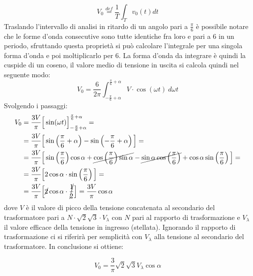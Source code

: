 \documentclass[a4paper,11pt]{article}
\begin{document}
\begin{equation}
 V_0 \stackrel{def}{=} \frac{1}{T}\int_T v_0(t) dt
 \label{eq:def_media_integrale}
\end{equation}
Traslando l'intervallo di analisi in ritardo di un angolo pari a \(\frac{\pi}{6}\) 
è possibile notare che le forme d'onda consecutive sono tutte identiche fra loro e pari %
a 6 in un periodo, sfruttando questa proprietà si può calcolare l'integrale per una singola forma d'onda e poi moltiplicarlo per 6.
La forma d'onda da integrare è quindi la cuspide di un coseno, il valore medio di 
tensione in uscita si calcola quindi nel seguente modo:
\begin{equation}
 V_0 = \frac{6}{2\pi} \int_{-\frac{\pi}{6}+\alpha}^{\frac{\pi}{6}+\alpha}
 V\cdot \cos (\omega t)\ d\omega t
\end{equation}
Svolgendo i passaggi:
\begin{align*}
 V_0 &= \frac{3V}{\pi} \Big[\sin(\omega t) \Big]_{-\frac{\pi}{6}+\alpha}^{\frac{\pi}{6}+\alpha} = \\
 &= \frac{3V}{\pi} \Big[\sin\left(\frac{\pi}{6}+\alpha \right) - \sin\left(-\frac{\pi}{6}+\alpha \right) \Big] = \\
 &=\frac{3V}{\pi}\Big[\sin\left(\frac{\pi}{6} \right)\cos\alpha + \cancel{\cos\left(\frac{\pi}{6}\right)\sin\alpha} - \cancel{\sin\alpha\cos\left(\frac{\pi}{6}\right)} + \cos\alpha\sin\left(\frac{\pi}{6}\right) \Big] = \\
 &= \frac{3V}{\pi} \Big[2\cos\alpha\cdot\sin\left(\frac{\pi}{6}\right) \Big]= \\
 &= \frac{3V}{\pi} \Big[\cancel{2}\cos\alpha\cdot\cancel{\frac{1}{2}}\Big] = \frac{3V}{\pi}\cos\alpha
\end{align*}
dove \(V\) è il valore di picco della tensione concatenata al secondario del trasformatore
pari a \(N\cdot\sqrt2\sqrt3\cdot V_{\lambda} \) con \(N\) pari al rapporto di trasformazione
e \(V_{\lambda} \) il valore efficace della tensione in ingresso (stellata).
Ignorando il rapporto di trasformazione ci si riferirà per semplicità con \(V_{\lambda}\)
alla tensione al secondario del trasformatore.
In conclusione si ottiene:

\begin{equation}
 V_0 = \frac{3}{\pi} \sqrt{2} \sqrt{3} V_\lambda \cos\alpha
 \label{eq:valore_medio_tensione_ponte}
\end{equation}
\end{document}
